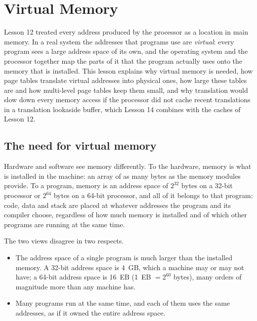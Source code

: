 \documentclass[../main.tex]{subfiles}
\begin{document}
\chapter{Virtual Memory}

Lesson 12 treated every address produced by the processor as a location in
main memory.  In a real system the addresses that programs use are
\emph{virtual}: every program sees a large address space of its own, and the
operating system and the processor together map the parts of it that the
program actually uses onto the memory that is installed.  This lesson explains
why virtual memory is needed, how page tables translate virtual addresses into
physical ones, how large these tables are and how multi-level page tables keep
them small, and why translation would slow down every memory access if the
processor did not cache recent translations in a translation lookaside buffer,
which Lesson 14 combines with the caches of Lesson 12.

\section{The need for virtual memory}
\label{sec:l13-why}

Hardware and software see memory differently.  To the hardware, memory is what is installed
in the machine: an array of as many bytes as the memory modules provide.  To a
program, memory is an address space of $2^{32}$ bytes on a 32-bit processor or
$2^{64}$ bytes on a 64-bit processor, and all of it belongs to that program:
code, data and stack are placed at whatever addresses the program and its
compiler choose, regardless of how much memory is installed and of which other
programs are running at the same time.

The two views disagree in two respects.
\begin{itemize}
  \item The address space of a single program is much larger than the
    installed memory.  A 32-bit address space is 4~GB, which a machine may or
    may not have; a 64-bit address space is 16~EB (1~EB $= 2^{60}$ bytes),
    many orders of magnitude more than any machine has.
  \item Many programs run at the same time, and each of them uses the same
    addresses, as if it owned the entire address space.
\end{itemize}
\end{document}
